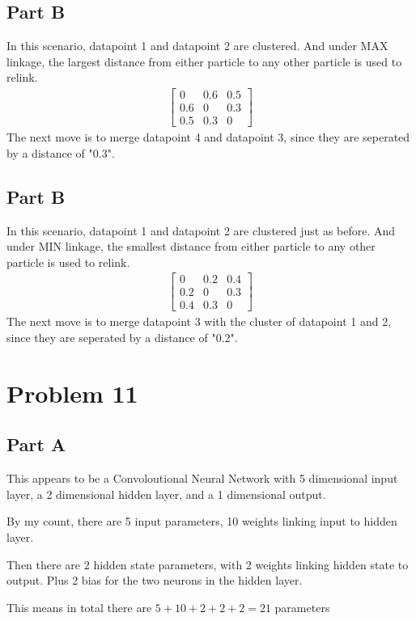 \documentclass{article}
\begin{document}
\subsection*{Part B}
In this scenario, datapoint 1 and datapoint 2 are clustered. And under MAX linkage, the largest distance from either particle to any other particle is used to relink.
\begin{align*}
\begin{bmatrix}
0   & 0.6 & 0.5 \\
0.6 &  0  & 0.3 \\
0.5 & 0.3 &  0 
\end{bmatrix}
\end{align*}
The next move is to merge datapoint 4 and datapoint 3, since they are seperated by a distance of "0.3".
\subsection*{Part B}
In this scenario, datapoint 1 and datapoint 2 are clustered just as before. And under MIN linkage, the smallest distance from either particle to any other particle is used to relink.
\begin{align*}
\begin{bmatrix}
0   & 0.2 & 0.4 \\
0.2 &  0  & 0.3 \\
0.4 & 0.3 &  0 
\end{bmatrix}
\end{align*}
The next move is to merge datapoint 3 with the cluster of datapoint 1 and 2, since they are seperated by a distance of "0.2".

\clearpage

\section*{Problem 11}
\subsection*{Part A}
This appears to be a Convoloutional Neural Network with 5 dimensional input layer, a 2 dimensional hidden layer, and a 1 dimensional output.

By my count, there are 5 input parameters, 10 weights linking input to hidden layer.

Then there are 2 hidden state parameters, with 2 weights linking hidden state to output. Plus 2 bias for the two neurons in the hidden layer.

This means in total there are $\boxed{ 5+10+2+2+2=21}$ parameters
\end{document}
